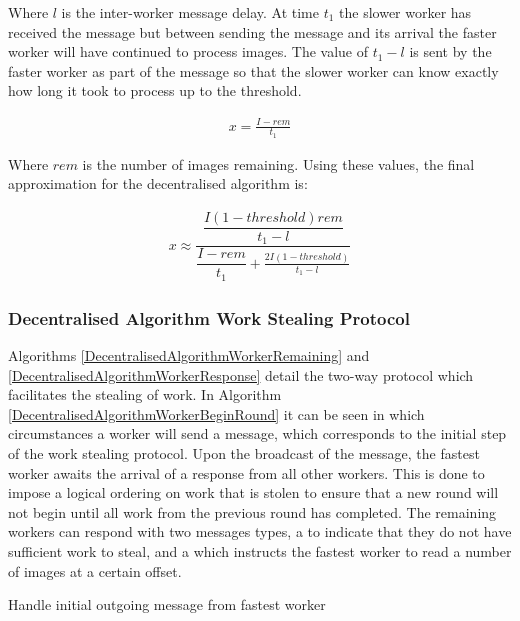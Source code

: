 \documentclass[12pt]{article}
\begin{document}
Where $l$ is the inter-worker message delay. At time $t_1$ the slower worker has received the message but between sending the message and its arrival the faster worker will have continued to process images. The value of $t_1 - l$ is sent by the faster worker as part of the message so that the slower worker can know exactly how long it took to process up to the threshold.

\begin{align*}
x = \frac{I - rem}{t_1}
\end{align*}

Where $rem$ is the number of images remaining.
\newline
Using these values, the final approximation for the decentralised algorithm is:

\begin{align*}
x \approx \dfrac{\dfrac{I(1 - threshold)rem}{t_1 - l}}{\dfrac{I - rem}{t_1} + \frac{2I(1 - threshold)}{t_1 - l}}
\end{align*}

\subsubsection{Decentralised Algorithm Work Stealing Protocol}

Algorithms \ref{DecentralisedAlgorithmWorkerRemaining} and \ref{DecentralisedAlgorithmWorkerResponse} detail the two-way protocol which facilitates the stealing of work. In Algorithm \ref{DecentralisedAlgorithmWorkerBeginRound} it can be seen in which circumstances a worker will send a  message, which corresponds to the initial step of the work stealing protocol.
\newline
\newline
Upon the broadcast of the  message, the fastest worker awaits the arrival of a response from all other workers. This is done to impose a logical ordering on work that is stolen to ensure that a new round will not begin until all work from the previous round has completed. The remaining workers can respond with two messages types, a  to indicate that they do not have sufficient work to steal, and a  which instructs the fastest worker to read a number of images at a certain offset.

\IncMargin{1em}
\begin{algorithm}[H]
 \caption{Handle initial outgoing message from fastest worker}
 \label{DecentralisedAlgorithmWorkerRemaining}
 \end{algorithm}
 \DecMargin{1em}
 \medskip
\end{document}
